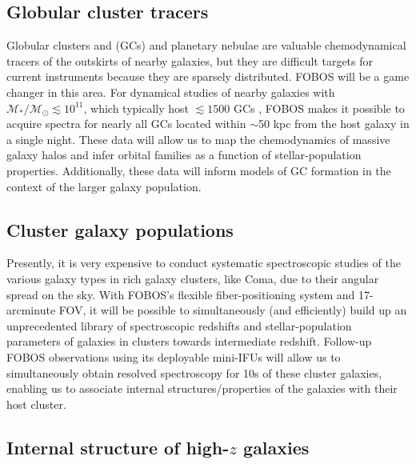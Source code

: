
\subsection{Globular cluster tracers}

Globular clusters and (GCs) and planetary nebulae are valuable
chemodynamical tracers of the outskirts of nearby galaxies, but they are
difficult targets for current instruments because they are sparsely
distributed. FOBOS will be a game changer in this area. For dynamical
studies of nearby galaxies with $\mathcal{M_\ast/M_\odot} \lesssim
10^{11}$, which typically host $\lesssim1500$ GCs
\citep{2013ApJ...772...82H}, FOBOS makes it possible to acquire
spectra for nearly all GCs located within $\sim$50 kpc from the host
galaxy in a single night. These data will allow us to map the
chemodynamics of massive galaxy halos and infer orbital families as a
function of stellar-population properties. Additionally, these data
will inform models of GC formation in the context of the larger
galaxy population.

\subsection{Cluster galaxy populations}

Presently, it is very expensive to conduct systematic spectroscopic
studies of the various galaxy types in rich galaxy clusters, like
Coma, due to their angular spread on the sky. With FOBOS's flexible
fiber-positioning system and 17-arcminute FOV, it will be possible to
simultaneously (and efficiently) build up an unprecedented library of
spectroscopic redshifts and stellar-population parameters of galaxies
in clusters towards intermediate redshift. Follow-up FOBOS
observations using its deployable mini-IFUs will allow us to
simultaneously obtain resolved spectroscopy for 10s of these cluster
galaxies, enabling us to associate internal structures/properties of
the galaxies with their host cluster.

\subsection{Internal structure of high-$z$ galaxies}

